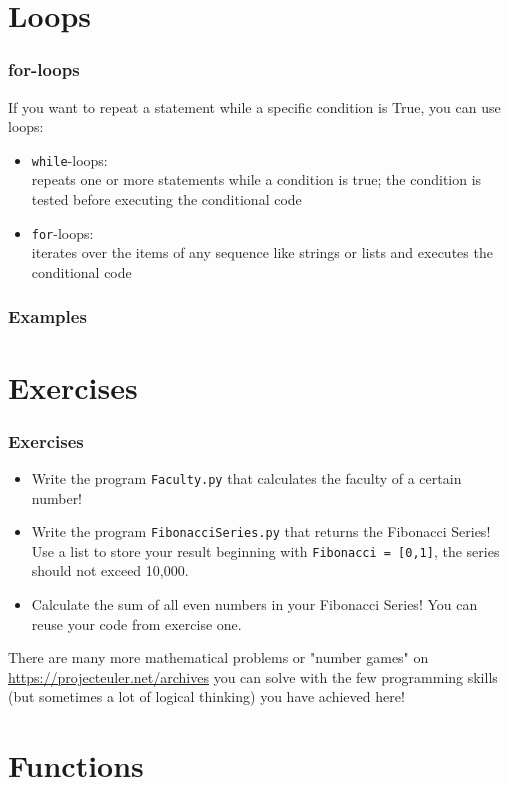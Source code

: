 \documentclass{beamer}
\begin{document}
\section{Loops}

\begin{frame}
\frametitle{for-loops}
	If you want to repeat a statement while a specific condition is True, you can use loops:
	\begin{itemize}
		\item \texttt{while}-loops: \\ repeats one or more statements while a condition is true; the condition is tested before executing the conditional code
		\item \texttt{for}-loops: \\ iterates over the items of any sequence like strings or lists and executes the conditional code
	\end{itemize}
\end{frame}

\begin{frame}
\frametitle{Examples}
	
\end{frame}

\section{Exercises}

\begin{frame}
\frametitle{Exercises}
	\begin{itemize}
		\item Write the program \texttt{Faculty.py} that calculates the faculty of a certain number!
		\item Write the program \texttt{FibonacciSeries.py} that returns the Fibonacci Series! Use a list to store your result beginning with \texttt{Fibonacci = [0,1]}, the series should not exceed 10,000.
		\item Calculate the sum of all even numbers in your Fibonacci Series! You can reuse your code from exercise one.
	\end{itemize}
	There are many more mathematical problems or "number games" on \url {https://projecteuler.net/archives} you can solve with the few programming skills (but sometimes a lot of logical thinking) you have achieved here!
\end{frame}

\section{Functions}
\end{document}
